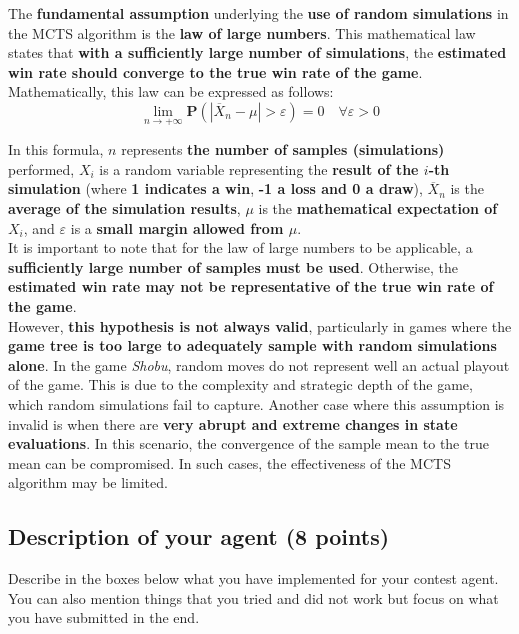 \documentclass[11pt,a4paper]{report}
\begin{document}
\begin{answers}[15cm]
The \textbf{fundamental assumption} underlying the \textbf{use of random simulations} in the MCTS algorithm is the \textbf{law of large numbers}. This mathematical law states that \textbf{with a sufficiently large number of simulations}, the \textbf{estimated win rate should converge to the true win rate of the game}. \\

Mathematically, this law can be expressed as follows:
\[
\lim_{n \to +\infty} \mathbf{P} \left( \left| \overline{X}_n - \mu \right| > \varepsilon \right) = 0 \quad \forall \varepsilon > 0
\]

In this formula, \(n\) represents \textbf{the number of samples (simulations)} performed, \(X_i\) is a random variable representing the \textbf{result of the \(i\)-th simulation} (where \textbf{1 indicates a win}, \textbf{-1 a loss and 0 a draw}), \(\overline{X}_n\) is the \textbf{average of the simulation results}, \(\mu\) is the \textbf{mathematical expectation of \(X_i\)}, and \(\varepsilon\) is a \textbf{small margin allowed from \(\mu\)}. \\

It is important to note that for the law of large numbers to be applicable, a \textbf{sufficiently large number of samples must be used}. Otherwise, the \textbf{estimated win rate may not be representative of the true win rate of the game}. \\

However, \textbf{this hypothesis is not always valid}, particularly in games where the \textbf{game tree is too large to adequately sample with random simulations alone}. In the game \textit{Shobu}, random moves do not represent well an actual playout of the game. This is due to the complexity and strategic depth of the game, which random simulations fail to capture. Another case where this assumption is invalid is when there are \textbf{very abrupt and extreme changes in state evaluations}. In this scenario, the convergence of the sample mean to the true mean can be compromised. In such cases, the effectiveness of the MCTS algorithm may be limited.

\end{answers}


\newpage
\subsection{Description of your agent (8 points)}
Describe in the boxes below what you have implemented for your contest agent. You can also mention things that you tried and did not work but focus on what you have submitted in the end.
\end{document}
